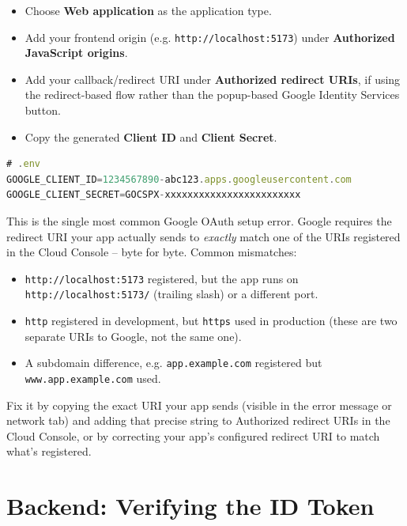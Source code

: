 \begin{itemize}
  \item Choose \textbf{Web application} as the application type.
  \item Add your frontend origin (e.g. \texttt{http://localhost:5173}) under
    \textbf{Authorized JavaScript origins}.
  \item Add your callback/redirect URI under \textbf{Authorized redirect
    URIs}, if using the redirect-based flow rather than the popup-based
    Google Identity Services button.
  \item Copy the generated \textbf{Client ID} and \textbf{Client Secret}.
\end{itemize}

\begin{lstlisting}[language=JavaScript]
# .env
GOOGLE_CLIENT_ID=1234567890-abc123.apps.googleusercontent.com
GOOGLE_CLIENT_SECRET=GOCSPX-xxxxxxxxxxxxxxxxxxxxxxxx
\end{lstlisting}

\begin{warnbox}
This is the single most common Google OAuth setup error. Google requires the
redirect URI your app actually sends to \emph{exactly} match one of the URIs
registered in the Cloud Console -- byte for byte. Common mismatches:
\begin{itemize}
  \item \texttt{http://localhost:5173} registered, but the app runs on
    \texttt{http://localhost:5173/} (trailing slash) or a different port.
  \item \texttt{http} registered in development, but \texttt{https} used in
    production (these are two separate URIs to Google, not the same one).
  \item A subdomain difference, e.g. \texttt{app.example.com} registered but
    \texttt{www.app.example.com} used.
\end{itemize}
Fix it by copying the exact URI your app sends (visible in the error message
or network tab) and adding that precise string to Authorized redirect URIs
in the Cloud Console, or by correcting your app's configured redirect URI to
match what's registered.
\end{warnbox}

\section{Backend: Verifying the ID Token}

